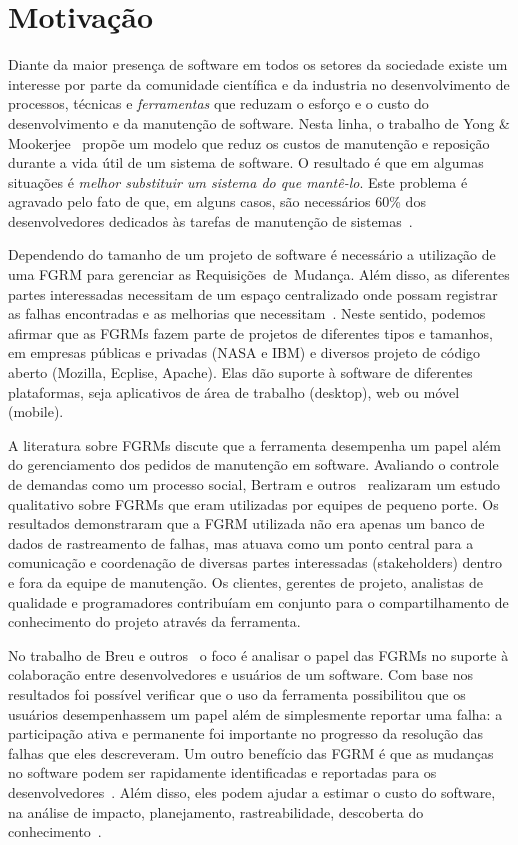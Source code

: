 \section{Motivação}
\label{sec:intro-motivacao}

Diante da maior presença de software em todos os setores da sociedade existe um
interesse por parte da comunidade científica e da industria no desenvolvimento
de processos, técnicas e \textit{ferramentas} que reduzam o esforço e o custo do
desenvolvimento e da manutenção de software. Nesta linha, o trabalho de Yong \&
Mookerjee~\cite{1423995} propõe um modelo que reduz os custos de manutenção e
reposição durante a vida útil de um sistema de software. O resultado é que em
algumas situações é \textit{melhor substituir um sistema do que mantê-lo}. Este
pro\-ble\-ma é agravado pelo fato de que, em alguns casos, são necessários 60\%
dos desenvolvedores dedicados às tarefas de manutenção de
sistemas~\cite{Zhang_2003}.

Dependendo do tamanho de um projeto de software é necessário a utilização de uma
FGRM para gerenciar as Requisições~de~Mudança. Além disso, as diferentes partes
interessadas necessitam de um espaço centralizado onde possam registrar as
falhas encontradas e as melhorias que necessitam~\cite{1407819}. Neste sentido,
podemos afirmar que as FGRMs fazem parte de projetos de diferentes tipos e
tamanhos, em empresas públicas e privadas (NASA e IBM) e diversos projeto de
código aberto (Mozilla, Ecplise, Apache). Elas dão suporte à software de
diferentes plataformas, seja aplicativos de área de trabalho (desktop), web ou
móvel (mobile).

A literatura sobre FGRMs discute que a ferramenta desempenha um papel além do
gerenciamento dos pedidos de manutenção em software. Avaliando o controle de
demandas como um processo social, Bertram e
outros~\cite{Bertram:2010:CCB:1718918.1718972} realizaram um estudo qualitativo
sobre FGRMs que eram utilizadas por equipes de pequeno porte. Os resultados
demonstraram que a FGRM utilizada não era apenas um banco de dados de
rastreamento de falhas, mas atuava como um ponto central para a comunicação e
coordenação de diversas partes interessadas (stakeholders) dentro e fora da
equipe de manutenção. Os clientes, gerentes de projeto, analistas de qualidade e
programadores contribuíam em conjunto para o compartilhamento de conhecimento do
projeto através da ferramenta.

No trabalho de Breu e outros~\cite{Breu:2010:INB:1718918.1718973} o foco é
analisar o papel das FGRMs no suporte à colaboração entre desenvolvedores e
usuários de um software. Com base nos resultados foi possível verificar que o
uso da ferramenta possibilitou que os usuários desempenhassem um papel além de
simplesmente reportar uma falha: a participação ativa e permanente foi
importante no progresso da resolução das falhas que eles descreveram. Um outro
benefício das FGRM é que as mudanças no software podem ser rapidamente
identificadas e reportadas para os desenvolvedores~\cite{anvik2005coping}. Além
disso, eles podem ajudar a estimar o custo do software, na análise de impacto,
planejamento, rastreabilidade, descoberta do
conhecimento~\cite{cavalcanti2013bug}.

